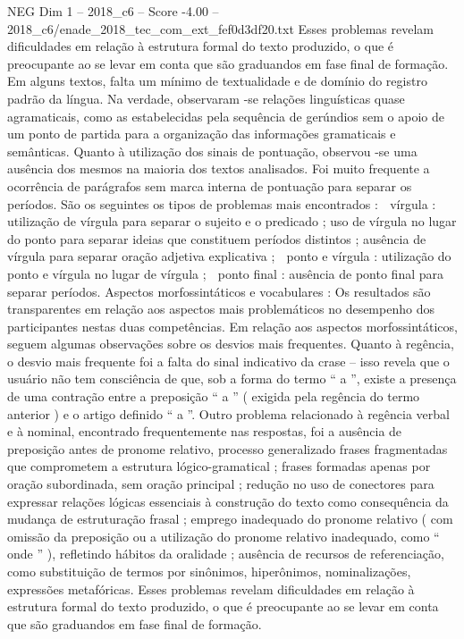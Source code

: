 \begin{textsample}{NEG Dim 1 – 2018\_c6 – Score -4.00 – 2018\_c6/enade\_2018\_tec\_com\_ext\_fef0d3df20.txt}
Esses problemas revelam dificuldades em relação à estrutura formal do texto produzido, o que é preocupante ao se levar em conta que são graduandos em fase final de formação.
Em alguns textos, falta um mínimo de textualidade e de domínio do registro padrão da língua.
Na verdade, observaram -se relações linguísticas quase agramaticais, como as estabelecidas pela sequência de gerúndios sem o apoio de um ponto de partida para a organização das informações gramaticais e semânticas.
Quanto à utilização dos sinais de pontuação, observou -se uma ausência dos mesmos na maioria dos textos analisados.
Foi muito frequente a ocorrência de parágrafos sem marca interna de pontuação para separar os períodos.
São os seguintes os tipos de problemas mais encontrados :  vírgula : utilização de vírgula para separar o sujeito e o predicado ; uso de vírgula no lugar do ponto para separar ideias que constituem períodos distintos ; ausência de vírgula para separar oração adjetiva explicativa ;  ponto e vírgula : utilização do ponto e vírgula no lugar de vírgula ;  ponto final : ausência de ponto final para separar períodos.
Aspectos morfossintáticos e vocabulares : Os resultados são transparentes em relação aos aspectos mais problemáticos no desempenho dos participantes nestas duas competências.
Em relação aos aspectos morfossintáticos, seguem algumas observações sobre os desvios mais frequentes.
Quanto à regência, o desvio mais frequente foi a falta do sinal indicativo da crase – isso revela que o usuário não tem consciência de que, sob a forma do termo “ a ”, existe a presença de uma contração entre a preposição “ a ” ( exigida pela regência do termo anterior ) e o artigo definido “ a ”.
Outro problema relacionado à regência verbal e à nominal, encontrado frequentemente nas respostas, foi a ausência de preposição antes de pronome relativo, processo generalizado frases fragmentadas que comprometem a estrutura lógico-gramatical ; frases formadas apenas por oração subordinada, sem oração principal ; redução no uso de conectores para expressar relações lógicas essenciais à construção do texto como consequência da mudança de estruturação frasal ; emprego inadequado do pronome relativo ( com omissão da preposição ou a utilização do pronome relativo inadequado, como “ onde ” ), refletindo hábitos da oralidade ; ausência de recursos de referenciação, como substituição de termos por sinônimos, hiperônimos, nominalizações, expressões metafóricas.
Esses problemas revelam dificuldades em relação à estrutura formal do texto produzido, o que é preocupante ao se levar em conta que são graduandos em fase final de formação.

\end{textsample}
